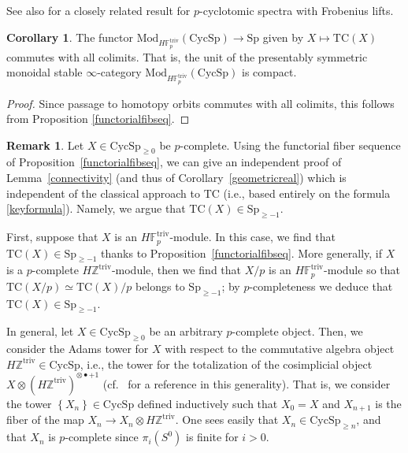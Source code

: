\documentclass{amsart}
\newcommand{\md}{\mathrm{Mod}}
\newcommand{\Sp}{\mathrm{Sp}}
\theoremstyle{definition}
\newtheorem{corollary}[definition]{Corollary}
\newtheorem{remark}[definition]{Remark}
\newcommand{\CycSp}{\mathrm{CycSp}}
\newcommand{\TC}{\mathrm{TC}}
\begin{document}
See also \cite[Prop. IV.3.4]{nikolaus-scholze} for a closely related result for
$p$-cyclotomic spectra with Frobenius lifts. 

\begin{corollary} 
\label{Fpcommutecolimit}
The functor 
 $\md_{H \mathbb{F}_p^{\mathrm{triv}}}(\CycSp) \to \Sp$ given by 
$X \mapsto \TC(X)$ 
  commutes with
all colimits. 
That is, the unit of the presentably symmetric monoidal stable $\infty$-category
 $\md_{H \mathbb{F}_p^{\mathrm{triv}}}(\CycSp)$ is compact.
 \end{corollary} 
\begin{proof}
Since passage to homotopy orbits commutes with all colimits, this follows from Proposition \ref{functorialfibseq}.
\end{proof}


\begin{remark} 
\label{rem:TCconnectivity}
Let $X \in \CycSp_{ \geq 0}$ be $p$-complete. 
Using the functorial fiber sequence of Proposition~\ref{functorialfibseq}, we
can give an independent proof 
of Lemma~\ref{connectivity} (and thus of Corollary~\ref{geometricreal}) which is independent of the classical approach to
$\TC$ (i.e., based entirely on the formula \eqref{keyformula}). 
Namely, we argue that $\TC(X) \in \Sp_{\geq -1}$. 

First, suppose that $X$ is an $H \mathbb{F}_p^{\mathrm{triv}}$-module. In this
case, we find that $\TC(X) \in \Sp_{\geq -1}$ thanks to
Proposition~\ref{functorialfibseq}. More generally, if $X$ is a
$p$-complete $H \mathbb{Z}^{\mathrm{triv}}$-module, then we find that $X/p$ is an
$H\mathbb{F}_p^{\mathrm{triv}}$-module so that $\TC(X/p) \simeq \TC(X)/p$ belongs
to $\Sp_{\geq -1}$; by $p$-completeness we deduce that $\TC(X) \in \Sp_{\geq
-1}$. 


In general, let $X \in \CycSp_{\geq 0}$ be an arbitrary $p$-complete object. 
Then, we consider the Adams tower for $X$ with respect to the commutative
algebra object $H\mathbb{Z}^{\mathrm{triv}} \in \CycSp$, i.e., the tower for
the totalization of the cosimplicial object $X \otimes
(H\mathbb{Z}^{\mathrm{triv}})^{\otimes \bullet + 1}$ (cf.~\cite[Sec.~2.1]{MNN17} for a reference in this generality). 
That is, we consider the tower $\left\{X_n\right\} \in \CycSp$ defined
inductively such that
$X_0 = X$ and $X_{n+1}$ is the fiber of the map $X_{n} \to X_n \otimes
H\mathbb{Z}^{\mathrm{triv}}$. 
One sees easily that $X_n \in \CycSp_{\geq n}$, and that $X_n$ is $p$-complete since $\pi_i(S^0)$ is finite for $i>0$.


\end{remark}
\end{document}
